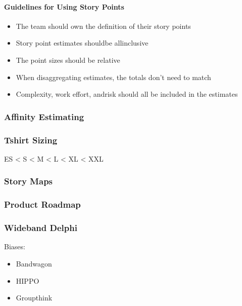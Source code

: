 \documentclass[letterpaper,10pt,english]{jupyterBook}
\begin{document}
\paragraph{Guidelines for Using Story Points}
\label{\detokenize{APM/agile:guidelines-for-using-story-points}}\begin{itemize}
\item {} 
\sphinxAtStartPar
The team should own the definition of their story points

\item {} 
\sphinxAtStartPar
Story point estimates shouldbe all\sphinxhyphen{}inclusive

\item {} 
\sphinxAtStartPar
The point sizes should be relative

\item {} 
\sphinxAtStartPar
When disaggregating estimates, the totals don’t need to match

\item {} 
\sphinxAtStartPar
Complexity, work effort, andrisk should all be included in the estimates

\end{itemize}


\subsubsection{Affinity Estimating}
\label{\detokenize{APM/agile:affinity-estimating}}

\subsubsection{T\sphinxhyphen{}shirt Sizing}
\label{\detokenize{APM/agile:t-shirt-sizing}}
\sphinxAtStartPar
ES < S < M < L < XL < XXL


\subsubsection{Story Maps}
\label{\detokenize{APM/agile:story-maps}}

\subsubsection{Product Roadmap}
\label{\detokenize{APM/agile:product-roadmap}}

\subsubsection{Wideband Delphi}
\label{\detokenize{APM/agile:wideband-delphi}}
\sphinxAtStartPar
Biases:
\begin{itemize}
\item {} 
\sphinxAtStartPar
Bandwagon

\item {} 
\sphinxAtStartPar
HIPPO

\item {} 
\sphinxAtStartPar
Groupthink

\end{itemize}
\end{document}
